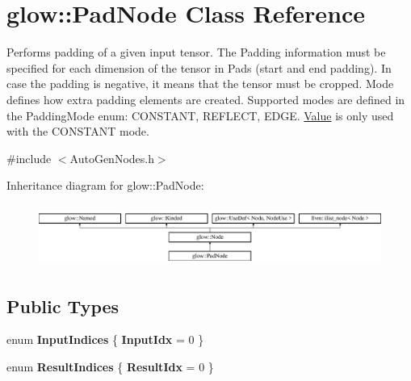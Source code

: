 \hypertarget{classglow_1_1_pad_node}{}\section{glow\+:\+:Pad\+Node Class Reference}
\label{classglow_1_1_pad_node}


Performs padding of a given input tensor. The Padding information must be specified for each dimension of the tensor in Pads (start and end padding). In case the padding is negative, it means that the tensor must be cropped. Mode defines how extra padding elements are created. Supported modes are defined in the Padding\+Mode enum\+: C\+O\+N\+S\+T\+A\+NT, R\+E\+F\+L\+E\+CT, E\+D\+GE. \hyperlink{classglow_1_1_value}{Value} is only used with the C\+O\+N\+S\+T\+A\+NT mode.  




{\ttfamily \#include $<$Auto\+Gen\+Nodes.\+h$>$}

Inheritance diagram for glow\+:\+:Pad\+Node\+:\begin{figure}[H]
\begin{center}
\leavevmode
\includegraphics[height=2.028986cm]{classglow_1_1_pad_node}
\end{center}
\end{figure}
\subsection*{Public Types}
\begin{DoxyCompactItemize}
\item 
\mbox{\label{classglow_1_1_pad_node_a23821d9c4e493508a2b32bd6be65a25b}} 
enum {\bfseries Input\+Indices} \{ {\bfseries Input\+Idx} = 0
 \}
\item 
\mbox{\label{classglow_1_1_pad_node_a6268d17e04e6932bb7e42aa256355b2d}} 
enum {\bfseries Result\+Indices} \{ {\bfseries Result\+Idx} = 0
 \}
\end{DoxyCompactItemize}
